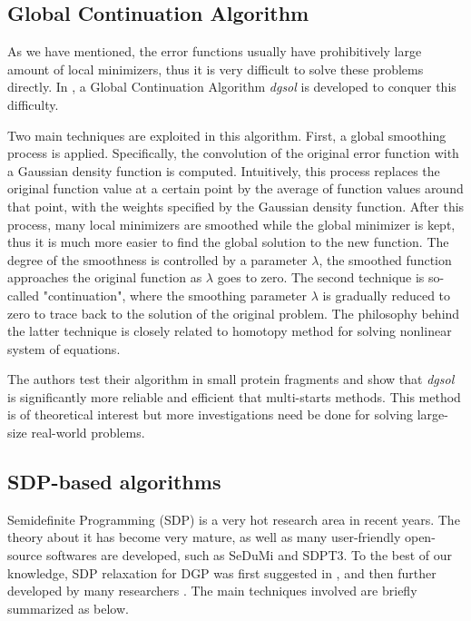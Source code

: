 \documentclass[a4paper,12pt]{article}
\begin{document}
\subsection{Global Continuation Algorithm}
As we have mentioned, the error functions usually have prohibitively large amount of local minimizers, thus it is very difficult to solve these problems directly. In \cite{More1997,More1999}, a Global Continuation Algorithm \emph{dgsol} is developed to conquer this difficulty.

Two main techniques are exploited in this algorithm. First, a global smoothing process is applied. Specifically, the convolution of the original error function with a Gaussian density function is computed. Intuitively, this process replaces the original function value at a certain point by the average of function values around that point, with the weights specified by the Gaussian density function. After this process, many local minimizers are smoothed while the global minimizer is kept, thus it is much more easier to find the global solution to the new function. The degree of the smoothness is controlled by a parameter $\lambda$, the smoothed function approaches the original function as $\lambda$ goes to zero. The second technique is so-called "continuation", where the smoothing parameter $\lambda$ is gradually reduced to zero to trace back to the solution of the original problem. The philosophy behind the latter technique is closely related to homotopy method for solving nonlinear system of equations.

The authors test their algorithm in small protein fragments \cite{More1999} and show that \emph{dgsol} is significantly more reliable and efficient that multi-starts methods. This method is of theoretical interest but more investigations need be done for solving large-size real-world problems.

\subsection{SDP-based algorithms}\label{subsec:sdp}
Semidefinite Programming (SDP) is a very hot research area in recent years. The theory about it has become very mature, as well as many user-friendly open-source softwares are developed, such as SeDuMi and SDPT3. To the best of our knowledge, SDP relaxation for DGP was first suggested in \cite{So2006}, and then further developed by many researchers \cite{Biswas2006-1,Biswas2008,Shamsi2010,Fang2013}. The main techniques involved are briefly summarized as below.
\end{document}

